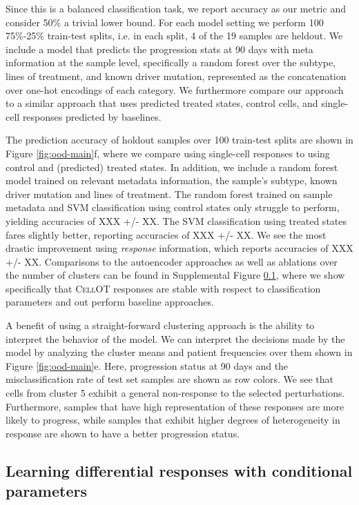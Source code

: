 Since this is a balanced classification task, we report accuracy as our metric and consider 50\% a trivial lower bound.
For each model setting we perform 100 75\%-25\% train-test splits, i.e. in each split, 4 of the 19 samples are heldout.
We include a model that predicts the progression stats at 90 days with meta information at the sample level, specifically a random forest over the subtype, lines of treatment, and known driver mutation, represented as the concatenation over one-hot encodings of each category.
We furthermore compare our approach to a similar approach that uses predicted treated states, control cells, and single-cell responses predicted by baselines.

The prediction accuracy of holdout samples over 100 train-test splits are shown in Figure \ref{fig:ood-main}f, where we compare using single-cell responses to using control and (predicted) treated states.
In addition, we include a random forest model trained on relevant metadata information, the sample’s subtype, known driver mutation and lines of treatment.
The random forest trained on sample metadata and SVM classification using control states only struggle to perform, yielding accuracies of XXX +/- XX. %
The SVM classification using treated states fares slightly better, reporting accuracies of XXX +/- XX. %
We see the most drastic improvement using \emph{response} information, which reports accuracies of XXX +/- XX. %
Comparisons to the autoencoder approaches as well as ablations over the number of clusters can be found in  Supplemental Figure \ref{}, where we show specifically that \textsc{CellOT} responses are stable with respect to classification parameters and out perform baseline approaches.

A benefit of using a straight-forward clustering approach is the ability to interpret the behavior of the model.
We can interpret the decisions made by the model by analyzing the cluster means and patient frequencies over them shown in Figure \ref{fig:ood-main}e.
Here, progression status at 90 days and the misclassification rate of test set samples are shown as row colors.
We see that cells from cluster 5 exhibit a general non-response to the selected perturbations.
Furthermore, samples that have high representation of these responses are more likely to progress,
while samples that exhibit higher degrees of heterogeneity in response are shown to have a better progression status.


\subsection{Learning differential responses with conditional parameters}

